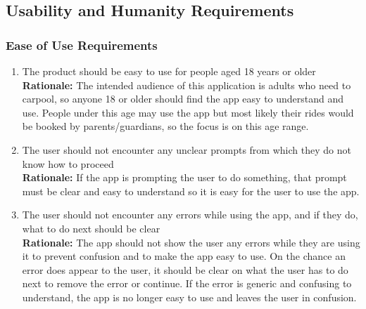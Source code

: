 \documentclass[]{article}
\begin{document}

\subsection{Usability and Humanity Requirements}
\label{sub:usability_and_humanity_requirements}

\subsubsection{Ease of Use Requirements}
\label{ssub:ease_of_use_requirements}
\begin{enumerate}[{UH-EOU}1. ]
	\item The product should be easy to use for people aged 18 years or older \\
	{\bf Rationale:} The intended audience of this application is adults who need to carpool, so anyone 18 or older should find the app easy to understand and use. People under this age may use the app but most likely their rides would be booked by parents/guardians, so the focus is on this age range.
	\item The user should not encounter any unclear prompts from which they do not know how to proceed \\
	{\bf Rationale:} If the app is prompting the user to do something, that prompt must be clear and easy to understand so it is easy for the user to use the app.
	\item The user should not encounter any errors while using the app, and if they do, what to do next should be clear \\
	{\bf Rationale:} The app should not show the user any errors while they are using it to prevent confusion and to make the app easy to use. On the chance an error does appear to the user, it should be clear on what the user has to do next to remove the error or continue. If the error is generic and confusing to understand, the app is no longer easy to use and leaves the user in confusion.
\end{enumerate}
\end{document}
